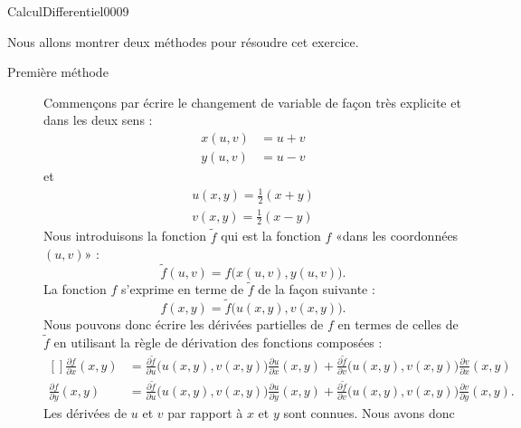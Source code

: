 \begin{corrige}{CalculDifferentiel0009}

	Nous allons montrer deux méthodes pour résoudre cet exercice.

	\begin{description}
		\item[Première méthode]
			Commençons par écrire le changement de variable de façon très explicite et dans les deux sens :
			\begin{subequations}
				\begin{align}
					x(u,v)&=u+v\\
					y(u,v)&=u-v
				\end{align}
			\end{subequations}
			et
			\begin{subequations}
				\begin{align}
					u(x,y)=\frac{ 1 }{2}(x+y)\\
					v(x,y)=\frac{ 1 }{2}(x-y)
				\end{align}
			\end{subequations}
			Nous introduisons la fonction $\tilde f$ qui est la fonction $f$ «dans les coordonnées $(u,v)$» :
			\begin{equation}
				\tilde f(u,v)=f\big( x(u,v),y(u,v) \big).
			\end{equation}
			La fonction $f$ s'exprime en terme de $\tilde f$ de la façon suivante :
			\begin{equation}
				f(x,y)=\tilde f\big( u(x,y),v(x,y) \big).
			\end{equation}
			Nous pouvons donc écrire les dérivées partielles de $f$ en termes de celles de $\tilde f$ en utilisant la règle de dérivation des fonctions composées :
			\begin{equation}
				\begin{aligned}[]
						\frac{ \partial f }{ \partial x }(x,y)&=\frac{ \partial \tilde f }{ \partial u }\big( u(x,y),v(x,y) \big)\frac{ \partial u }{ \partial x }(x,y)+\frac{ \partial \tilde f }{ \partial v }\big( u(x,y),v(x,y) \big)\frac{ \partial v }{ \partial x }(x,y)\\
						\frac{ \partial f }{ \partial y }(x,y)&=\frac{ \partial \tilde f }{ \partial u }\big( u(x,y),v(x,y) \big)\frac{ \partial u }{ \partial y }(x,y)+\frac{ \partial \tilde f }{ \partial v }\big( u(x,y),v(x,y) \big)\frac{ \partial v }{ \partial y }(x,y).
				\end{aligned}
			\end{equation}
			Les dérivées de $u$ et $v$ par rapport à $x$ et $y$ sont connues. Nous avons donc

\end{description}
\end{corrige}
